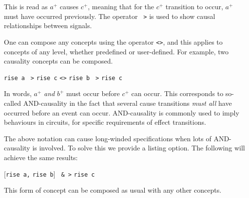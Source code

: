 \documentclass[british, 10pt, conference, compsocconf]{IEEEtran}
\begin{document}
\vspace{-1.5mm}

This is read as $a^{+}$ causes $c^{+}$, meaning that for the $c^{+}$ transition 
to occur, $a^{+}$ must have occurred previously. The operator
\texttt{~>}
is used to show causal relationships between signals.
 

One can compose any concepts using the
operator \texttt{<>}, and this applies
to concepts of any level, whether predefined or user-defined. For example, 
two causality concepts can be composed.

\vspace{-1.5mm}

\begin{center}
\texttt{rise a} \texttt{~>} \texttt{rise c} \texttt{<>} \texttt{rise b} \texttt{~>} \texttt{rise c}
\end{center}

\vspace{-2mm}

In words, $a^{+}$ \emph{and} $b^{+}$ must occur before $c^{+}$ can occur. 
This corresponds to so-called AND-causality in the fact that several cause 
transitions \emph{must all} have occurred before an event can occur. 
AND-causality is commonly used to imply behaviours in circuits, for specific 
requirements of effect transitions.  

The above notation can cause long-winded specifications when lots of 
AND-causality is involved. To solve this we provide a listing option. The 
following will achieve the same results:

\vspace{-3mm}

\begin{center}
      [\texttt{rise a,} \texttt{rise b}] \texttt{~&~>} \texttt{rise c}
\end{center}

\vspace{-1mm}

This form of concept can be composed as usual with any other concepts.
\end{document}
